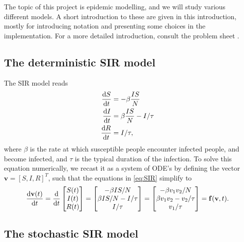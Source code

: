 The topic of this project is epidemic modelling, and we will study various different models. A short introduction to these are given in this introduction, mostly for introducing notation and presenting some choices in the implementation. For a more detailed introduction, consult the problem sheet \cite{sheet}.

\subsection{The deterministic SIR model}
The SIR model reads 
\begin{subequations}\label{eq:SIR}
\begin{align}
	\frac{\text{d} S}{\text{d} t} &= - \beta \frac{I S}{N}\\
	\frac{\text{d} I}{\text{d} t} &= \beta \frac{IS }{N} - I/\tau \\
	\frac{\text{d} R}{\text{d} t} &= I/\tau, 
\end{align}
\end{subequations}
where $\beta$ is the rate at which susceptible people encounter infected people, and become infected, and $\tau$ is the typical duration of the infection. To solve this equation numerically, we recast it as a system of ODE's by defining the vector $\mathbf{v} = [S,I,R]^T$, such that the equations in \ref{eq:SIR} simplify to
\begin{equation}\label{eq:sir_vect}
	\frac{\text{d} \mathbf{v}(t)}{\text{d} t} = \frac{\mathrm{d}}{\mathrm{d}t} \begin{bmatrix}
		S(t) \\
		I(t) \\
		R(t)
	\end{bmatrix}
	= \begin{bmatrix}
		- \beta IS/N \\
		\beta  IS/N - I/\tau \\
		I/\tau
	\end{bmatrix} = \begin{bmatrix}
		-\beta v_1 v_2 /N \\
		\beta v_1 v_2 - v_2/\tau \\
		v_1 / \tau
	\end{bmatrix}= \mathbf{f}(\mathbf{v},t).
\end{equation}

\subsection{The stochastic SIR model}

